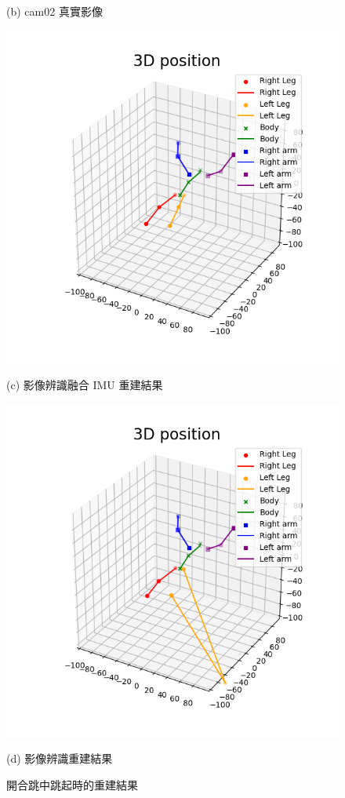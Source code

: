 \begin{figure}[!ht]
\begin{minipage}{.5\textwidth}
       \caption*{(b) cam02 真實影像}
    \end{minipage}
    \begin{minipage}{.5\textwidth}
       \centering
       \includegraphics[width=.95\linewidth]{figure/ch4_fig_jump_result_with1.png}
       \caption*{(c) 影像辨識融合 IMU 重建結果}
    \end{minipage}%
    \begin{minipage}{.5\textwidth}
       \centering
       \includegraphics[width=.95\linewidth]{figure/ch4_fig_jump_result_no1.png}
       \caption*{(d) 影像辨識重建結果}
    \end{minipage}
   \caption[開合跳中跳起時的重建結果]{開合跳中跳起時的重建結果}
   \label{ch4_fig_jump_jump}
\end{figure}

